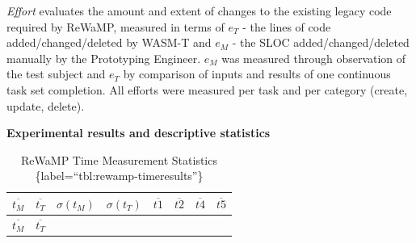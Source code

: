 \emph{Effort} evaluates the amount and extent of changes to the existing legacy code required by ReWaMP, measured in terms of \(e_T\) - the lines of code added/changed/deleted by WASM-T and
\(e_M\) - the SLOC added/changed/deleted manually by the Prototyping Engineer.
\(e_M\) was measured through observation of the test subject and \(e_T\) by comparison of inputs and results of one continuous task set completion.
All efforts were measured per task and per category (create, update, delete).

\textbf{Experimental results and descriptive statistics}

\begin{longtable}[]{@{}llllllll@{}}
\caption{ReWaMP Time Measurement Statistics \{label=``tbl:rewamp-timeresults''\}}\tabularnewline
\toprule
\begin{minipage}[b]{0.11\columnwidth}\raggedright
\(\overline{t_M}\)\strut
\end{minipage} & \begin{minipage}[b]{0.11\columnwidth}\raggedright
\(\overline{t_T}\)\strut
\end{minipage} & \begin{minipage}[b]{0.09\columnwidth}\raggedright
\(\sigma(t_M)\)\strut
\end{minipage} & \begin{minipage}[b]{0.09\columnwidth}\raggedright
\(\sigma(t_T)\)\strut
\end{minipage} & \begin{minipage}[b]{0.10\columnwidth}\raggedright
\(\overline{t1}\)\strut
\end{minipage} & \begin{minipage}[b]{0.10\columnwidth}\raggedright
\(\overline{t2}\)\strut
\end{minipage} & \begin{minipage}[b]{0.10\columnwidth}\raggedright
\(\overline{t4}\)\strut
\end{minipage} & \begin{minipage}[b]{0.10\columnwidth}\raggedright
\(\overline{t5}\)\strut
\end{minipage}\tabularnewline
\midrule
\endfirsthead
\toprule
\begin{minipage}[b]{0.11\columnwidth}\raggedright
\(\overline{t_M}\)\strut
\end{minipage} & \begin{minipage}[b]{0.11\columnwidth}\raggedright
\(\overline{t_T}\)\strut
\end{minipage} & \begin{minipage}[b]{0.09\columnwidth}\raggedright

\end{minipage}
\end{longtable}

